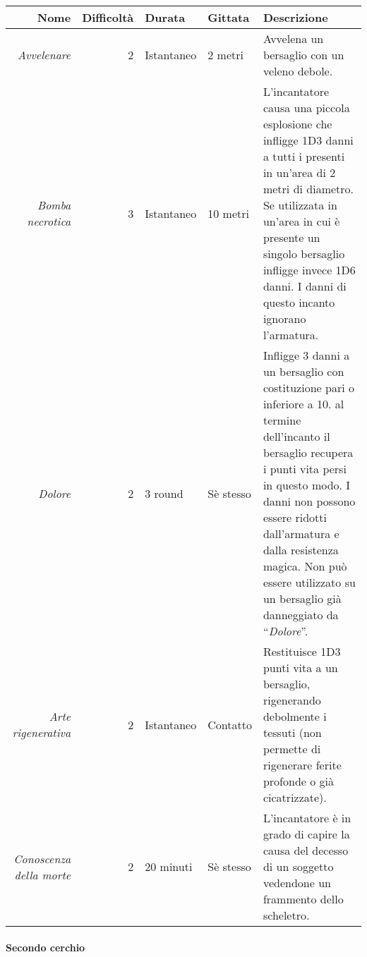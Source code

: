 \documentclass[../manuale_main.tex]{subfiles}
\begin{document}
\begin{tabularx}{\linewidth}{|N| D| T| G| Y|}
\hline
\textbf{Nome} & \textbf{Difficoltà} & \textbf{Durata} & \textbf{Gittata} & \textbf{Descrizione} \\ \hline\hline
\textit{Avvelenare} & 2 & Istantaneo & 2 metri &Avvelena un bersaglio con un veleno debole.  \\ \hline
\textit{Bomba necrotica} & 3 &Istantaneo  & 10 metri  & L'incantatore causa una piccola esplosione che infligge 1D3 danni a tutti i presenti in un'area di 2 metri di diametro. Se utilizzata in un’area in cui è presente un singolo bersaglio infligge invece 1D6 danni. I danni di questo incanto ignorano l'armatura.\\ \hline
\textit{Dolore} & 2 & 3 round & Sè stesso & Infligge 3 danni a un bersaglio con costituzione pari o inferiore a 10. al termine dell'incanto il bersaglio recupera i punti vita persi in questo modo. I danni non possono essere ridotti dall'armatura e dalla resistenza magica. Non può essere utilizzato su un bersaglio già danneggiato da “\emph{Dolore}”.  \\ \hline
\textit{Arte rigenerativa} & 2  & Istantaneo & Contatto &Restituisce 1D3 punti vita a un bersaglio, rigenerando debolmente i tessuti (non permette di rigenerare ferite profonde o già cicatrizzate).\\ \hline
\textit{Conoscenza della morte} & 2 & 20 minuti & Sè stesso & L'incantatore è in grado di capire la causa del decesso di un soggetto vedendone un frammento dello scheletro. \\
\hline
\end{tabularx}

\paragraph{Secondo cerchio}\mbox{}\\
\end{document}
